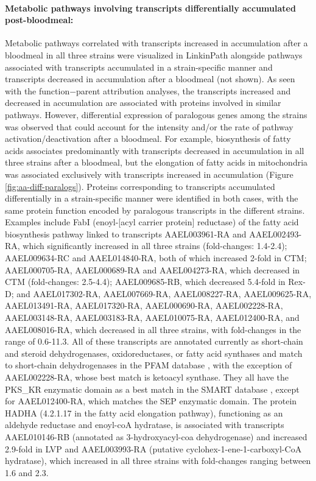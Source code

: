 \paragraph*{Metabolic pathways involving transcripts differentially accumulated post-bloodmeal:}


Metabolic pathways correlated with transcripts increased in accumulation after a bloodmeal in all three strains were visualized in LinkinPath \cite{Ingsriswang2011} alongside pathways associated with transcripts accumulated in a strain-specific manner and transcripts decreased in accumulation after a bloodmeal (not shown).
As seen with the function−parent attribution analyses, the transcripts increased and decreased in accumulation are associated with proteins involved in similar pathways.
However, differential expression of paralogous genes among the strains was observed that could account for the intensity and/or the rate of pathway activation/deactivation after a bloodmeal.
For example, biosynthesis of fatty acids associates predominantly with transcripts decreased in accumulation in all three strains after a bloodmeal, but the elongation of fatty acids in mitochondria was associated exclusively with transcripts increased in accumulation (Figure \ref{fig:aa-diff-paralogs}).
Proteins corresponding to transcripts accumulated differentially in a strain-specific manner were identified in both cases, with the same protein function encoded by paralogous transcripts in the different strains.
Examples include FabI (enoyl-[acyl carrier protein] reductase) of the fatty acid biosynthesis pathway linked to transcripts AAEL003961-RA and AAEL002493-RA, which significantly increased in all three strains (fold-changes: 1.4-2.4); AAEL009634-RC and AAEL014840-RA, both of which increased 2-fold in \gls{CTM}; AAEL000705-RA, AAEL000689-RA and AAEL004273-RA, which decreased in \gls{CTM} (fold-changes: 2.5-4.4); AAEL009685-RB, which decreased 5.4-fold in \gls{Rex-D}; and AAEL017302-RA, AAEL007669-RA, AAEL008227-RA, AAEL009625-RA, AAEL013491-RA, AAEL017320-RA, AAEL000690-RA, AAEL002228-RA, AAEL003148-RA, AAEL003183-RA, AAEL010075-RA, AAEL012400-RA, and AAEL008016-RA, which decreased in all three strains, with fold-changes in the range of 0.6-11.3.
All of these transcripts are annotated currently as short-chain and steroid dehydrogenases, oxidoreductases, or fatty acid synthases \cite{Ribeiro-AegyXcel} and match to short-chain dehydrogenases in the PFAM database \cite{Finn2008}, with the exception of AAEL002228-RA, whose best match is ketoacyl synthase.
They all have the PKS\_KR enzymatic domain as a best match in the SMART database \cite{Letunic2009}, except for AAEL012400-RA, which matches the SEP enzymatic domain.
The protein HADHA (4.2.1.17 in the fatty acid elongation pathway), functioning as an aldehyde reductase and enoyl-coA hydratase, is associated with transcripts AAEL010146-RB (annotated as 3-hydroxyacyl-coa dehydrogenase) and increased 2.9-fold in \gls{LVP} and AAEL003993-RA (putative cyclohex-1-ene-1-carboxyl-CoA hydratase), which increased in all three strains with fold-changes ranging between 1.6 and 2.3.


